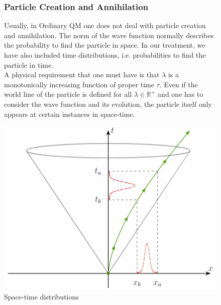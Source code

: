 \documentclass[twoside,a4paper,11pt]{article}
\numberwithin{equation}{section}
\begin{document}
\iffalse
\begin{figure}[H]
  \centering
  \begin{minipage}[H]{0.49\textwidth}
    \justify
\subsubsection{Particle Creation and Annihilation}


Usually, in Ordinary QM one does not deal with particle creation and annihilation. The norm of the wave function normally describes the probability to find the particle in space. In our treatment, we have also included time distributions, i.e. probabilities to find the particle in time. \\

A physical requirement that one must have is that $\lambda$ is a monotonically increasing function of proper time $\tau$. Even if the world line of the particle is defined for all $\lambda \in \mathbb{R}^+$ and one has to consider the wave function and its evolution, the particle itself only appears at certain instances in space-time. \\

  \end{minipage}
  \hfill
  \begin{minipage}[H]{0.49\textwidth}
    \centering
    \includegraphics[width=1.0\textwidth]{Pics/LightCones_PosDisl.PNG}
    \caption{Space-time distributions}
    \label{picpositionspread}
\end{minipage}
\end{figure}
\end{document}
